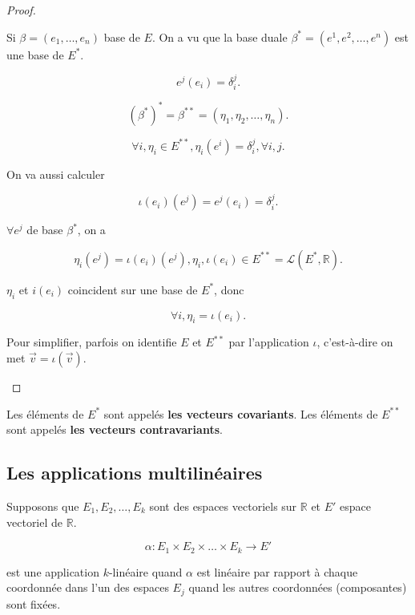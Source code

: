 \documentclass[french]{article}
\begin{document}
\begin{proof}
\begin{enumerate}
    Si $\beta = (e_1, \dots, e_n)$ base de $E$. On a vu que la base duale $\beta ^{*} = (e ^{1}, e ^2, \dots, e ^{n})$ est une base de $E ^{*}$.

    \[
    e ^{j}(e_i) = \delta_i ^{j}.
    \]

    \[
    (\beta ^{*}) ^{*} = \beta ^{**} = (\eta_1, \eta_2, \dots, \eta_n).
    \]

    \begin{equation} \label{base1}
      \forall i, \eta_i \in E ^{**}, \eta_i(e ^{i}) = \delta_i ^{j}, \forall i, j.
    \end{equation}

    On va aussi calculer

    \begin{equation} \label{base2}
      \iota(e_i)(e ^{j}) = e ^{j}(e_i) = \delta_i ^{j}.
    \end{equation}

    $\forall e ^{j}$ de base $\beta ^{*}$, on a

    \[
    \eta_i(e ^{j}) = \iota(e_i)(e ^{j}), \eta_i, \iota(e_i) \in E ^{**} = \mathscr{L}(E ^{*}, \mathbb{R}).
    \]

    $\eta _i$ et $i(e_i)$ coincident sur une base de $E ^{*}$, donc

    \[
    \forall i, \eta_i = \iota(e_i).
    \]

    Pour simplifier, parfois on identifie $E$ et $E ^{**}$ par l'application $\iota$, c'est-à-dire on met $\overrightarrow{ v } = \iota(\overrightarrow{ v })$.
  \end{enumerate}
\end{proof}

Les éléments de $E ^{*}$ sont appelés \textbf{les vecteurs covariants}. Les éléments de $E ^{**}$ sont appelés \textbf{les vecteurs contravariants}.

\subsection{Les applications multilinéaires}

Supposons que $E_1, E_2, \dots, E_k$ sont des espaces vectoriels sur $\mathbb{R}$ et $E'$ espace vectoriel de $\mathbb{R}$.

\[
\alpha : E_1 \times E_2 \times \dots \times E_k \longrightarrow E'
\]

est une application $k$-linéaire quand $\alpha$ est linéaire par rapport à chaque coordonnée dans l'un des espaces $E_j$ quand les autres coordonnées (composantes) sont fixées.
\end{document}
